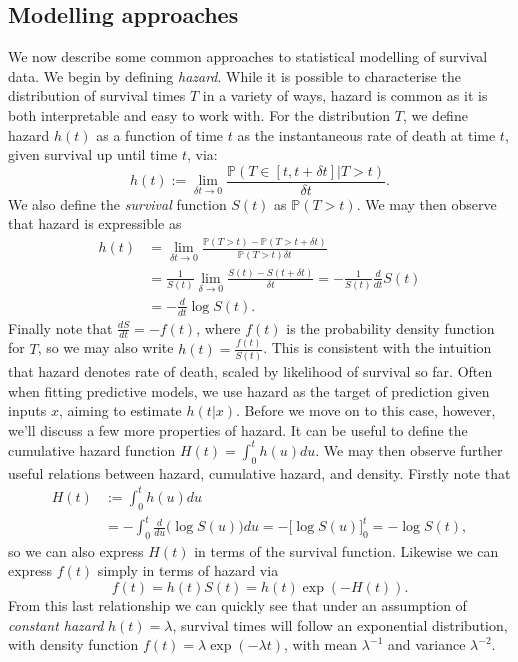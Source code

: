 \documentclass[../thesis.tex]{subfiles}
\begin{document}
\subsection{Modelling approaches} \label{sec:survival_modelling}
We now describe some common approaches to statistical modelling of survival data. We begin by defining \textit{hazard}. While it is possible to characterise the distribution of survival times $T$ in a variety of ways, hazard is common as it is both interpretable and easy to work with. For the distribution $T$, we define hazard $h(t)$ as a function of time $t$ as the instantaneous rate of death at time $t$, given survival up until time $t$, via:
\[
    h(t) := \lim_{\delta t \rightarrow 0} \frac{\mathbb{P}(T \in [t, t + \delta t] | T > t)}{\delta t}.
\]
We also define the \textit{survival} function $S(t)$ as $\mathbb{P}(T > t)$. We may then observe that hazard is expressible as 
\begin{align*}
    h(t) & = \lim_{\delta t \rightarrow 0} \frac{\mathbb{P}(T > t) - \mathbb{P}(T > t + \delta t)}{\mathbb{P}(T > t) \delta t} \\
    & = \frac{1}{S(t)} \lim_{\delta \rightarrow 0} \frac{S(t) - S(t + \delta t)}{\delta t} = - \frac{1}{S(t)} \frac{d}{dt} S(t)\\
    & = - \frac{d}{dt} \log S(t). 
\end{align*}
Finally note that $\frac{dS}{dt} = - f(t)$, where $f(t)$ is the probability density function for $T$, so we may also write $h(t) = \frac{f(t)}{S(t)}$. This is consistent with the intuition that hazard denotes rate of death, scaled by likelihood of survival so far. Often when fitting predictive models, we use hazard as the target of prediction given inputs $x$, aiming to estimate $h(t|x)$. Before we move on to this case, however, we'll discuss a few more properties of hazard. It can be useful to define the cumulative hazard function $H(t) = \int_{0}^{t}h(u)du$. We may then observe further useful relations between hazard, cumulative hazard, and density. Firstly note that 
\begin{align*}
H(t) & := \int_{0}^{t}h(u)du \\
& = -\int_{0}^{t}\frac{d}{du} \big(\log S(u)\big) du  = - \big[\log S(u) \big]_{0}^{t}  = -\log S(t),
\end{align*}
so we can also express $H(t)$ in terms of the survival function. Likewise we can express $f(t)$ simply in terms of hazard via
\[ f(t) = h(t)S(t) = h(t)\exp (-H(t)).\]
From this last relationship we can quickly see that under an assumption of \emph{constant hazard} $h(t)=\lambda$, survival times will follow an exponential distribution, with density function $f(t) = \lambda \exp(-\lambda t)$, with mean $\lambda^{-1}$ and variance $\lambda^{-2}$.
\end{document}
